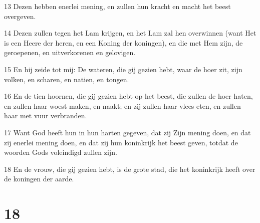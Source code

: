 \par 13 Dezen hebben enerlei mening, en zullen hun kracht en macht het beest overgeven.
\par 14 Dezen zullen tegen het Lam krijgen, en het Lam zal hen overwinnen (want Het is een Heere der heren, en een Koning der koningen), en die met Hem zijn, de geroepenen, en uitverkorenen en gelovigen.
\par 15 En hij zeide tot mij: De wateren, die gij gezien hebt, waar de hoer zit, zijn volken, en scharen, en natien, en tongen.
\par 16 En de tien hoornen, die gij gezien hebt op het beest, die zullen de hoer haten, en zullen haar woest maken, en naakt; en zij zullen haar vlees eten, en zullen haar met vuur verbranden.
\par 17 Want God heeft hun in hun harten gegeven, dat zij Zijn mening doen, en dat zij enerlei mening doen, en dat zij hun koninkrijk het beest geven, totdat de woorden Gods voleindigd zullen zijn.
\par 18 En de vrouw, die gij gezien hebt, is de grote stad, die het koninkrijk heeft over de koningen der aarde.

\chapter{18}

